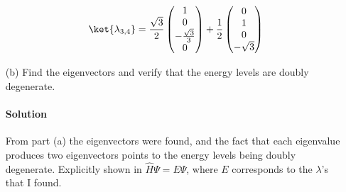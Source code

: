 \documentclass{article}
\begin{document}
\begin{enumerate}
		\begin{equation}
			\ket{\lambda_{3,4}} = \frac{\sqrt{3}}{2} \begin{pmatrix}
				1 \\
				0 \\
				-\frac{\sqrt{3}}{3} \\
				0
			\end{pmatrix} + \frac{1}{2} \begin{pmatrix}
				0 \\
				1 \\
				0 \\
				-\sqrt{3}
			\end{pmatrix}
		\end{equation}
		
		\item[(b)] Find the eigenvectors and verify that the energy levels are doubly degenerate.
		\paragraph{Solution} From part (a) the eigenvectors were found, and the fact that each eigenvalue produces two eigenvectors points to the energy levels being doubly degenerate. Explicitly shown in $\hat{H} \Psi = E \Psi$, where $E$ corresponds to the $\lambda$'s that I found.
	\end{enumerate}
	
	
	
\end{document}
